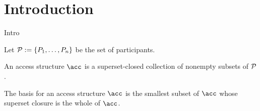 \chapter{Introduction}

Intro
\cite{Phillips1992}

Let ${\mathcal P} := \{ P_1, \dots, P_n \}$ be the set of participants.

An access structure $\acc$ is a superset-closed collection of nonempty subsets of ${\mathcal P}$.

The basis for an access structure $\acc$ is the smallest subset of $\acc$ whose superset closure is the whole of $\acc$.


